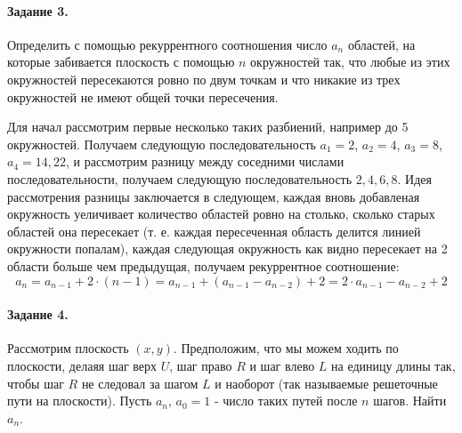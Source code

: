 \documentclass[a4paper,12pt]{article}
\begin{document}
\begin{Solution}
\end{Solution}

\paragraph{Задание 3.} Определить с помощью рекуррентного соотношения число $a_n$ областей, на которые забивается плоскость с помощью $n$ окружностей так, что любые из этих окружностей пересекаются ровно по двум точкам и что никакие из трех окружностей не имеют общей точки пересечения.

\begin{Solution}
Для начал рассмотрим первые несколько таких разбиений, например до 5 окружностей. Получаем следующую последовательность $a_1 = 2$, $a_2 = 4$, $a_3 = 8$, $a_4 = 14, 22$, и рассмотрим разницу между соседними числами последовательности, получаем следующую последовательность $2, 4, 6, 8$. Идея рассмотрения разницы заключается в следующем, каждая вновь добавленая окружность уеличивает количество областей ровно на столько, сколько старых областей она пересекает (т. е. каждая пересеченная область делится линией окружности попалам), каждая следующая окружность как видно пересекает на 2 области больше чем предыдущая, получаем рекуррентное соотношение:
\[
	a_n = a_{n-1} + 2 \cdot (n-1) = a_{n-1} + (a_{n-1} - a_{n-2}) + 2 = 2 \cdot a_{n-1} - a_{n-2} + 2
\]
\end{Solution}

\paragraph{Задание 4.} Рассмотрим плоскость $\left(x,y\right)$. Предположим, что мы можем ходить по плоскости, делаяя шаг верх $U$, шаг право $R$ и шаг влево $L$ на единицу длины так, чтобы шаг $R$ не следовал за шагом $L$ и наоборот (так называемые решеточные пути на плоскости). Пусть $a_n$, $a_0=1$ - число таких путей после $n$ шагов. Найти $a_n$.
\end{document}

